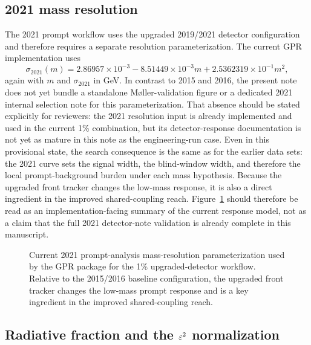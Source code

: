 \subsection{2021 mass resolution}
\label{sec:massres-2021}

The 2021 prompt workflow uses the upgraded 2019/2021 detector configuration and
therefore requires a separate resolution parameterization. The current GPR
implementation uses
\begin{equation}
\sigma_{2021}(m)
= 2.86957\times10^{-3} - 8.51449\times10^{-3}m + 2.5362319\times10^{-1}m^2,
\label{eq:sigma2021}
\end{equation}
again with $m$ and $\sigma_{2021}$ in GeV. In contrast to 2015 and 2016, the present
note does not yet bundle a standalone M{\o}ller-validation figure or a dedicated 2021
internal selection note for this parameterization. That absence should be stated
explicitly for reviewers: the 2021 resolution input is already implemented and used in
the current 1\% combination, but its detector-response documentation is not yet as
mature in this note as the engineering-run case. Even in this provisional state, the
search consequence is the same as for the earlier data sets: the 2021 curve sets the
signal width, the blind-window width, and therefore the local prompt-background burden
under each mass hypothesis. Because the upgraded front tracker changes the low-mass
response, it is also a direct ingredient in the improved shared-coupling reach.
Figure~\ref{fig:2021-resolution} should therefore be read as an implementation-facing
summary of the current response model, not as a claim that the full 2021 detector-note
validation is already complete in this manuscript.

\begin{figure}[H]
\centering
{}
\caption{Current 2021 prompt-analysis mass-resolution parameterization used by the GPR
package for the 1\% upgraded-detector workflow. Relative to the 2015/2016 baseline
configuration, the upgraded front tracker changes the low-mass prompt response and is a
key ingredient in the improved shared-coupling reach.}
\label{fig:2021-resolution}
\end{figure}

\subsection{Radiative fraction and the \texorpdfstring{$\varepsilon^2$}{epsilon2} normalization}
\label{sec:radfrac}

